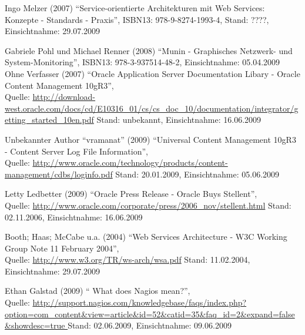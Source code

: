 \documentclass[12pt, a4paper, headsepline]{article}
\begin{document}
\begin{thebibliography}{xxxxxxxx}
		 Ingo Melzer (2007) "`Service-orientierte Architekturen mit Web Services: Konzepte - Standards - Praxis"', \newline ISBN13: 978-9-8274-1993-4, \newline Stand: ????, Einsichtnahme: 29.07.2009	 
		 
		 	  Gabriele Pohl und Michael Renner (2008) 
	 "`Munin - Graphisches Netzwerk- und System-Monitoring"', \newline ISBN13: 978-3-937514-48-2, Einsichtnahme: 05.04.2009\\	
	 	
	 
	  Ohne Verfasser (2007) "`Oracle Application Server Documentation Libary - Oracle Content Management 10gR3"', \\ Quelle: \url{http://download-west.oracle.com/docs/cd/E10316_01/cs/cs_doc_10/documentation/integrator/getting_started_10en.pdf} \newline Stand: unbekannt, Einsichtnahme: 16.06.2009
	 
	 	  Unbekannter Author "`vramanat"' (2009) "`Universal Content Management 10gR3 - Content Server Log File Information"', \\ Quelle: \url{http://www.oracle.com/technology/products/content-management/cdbs/loginfo.pdf} \newline Stand: 20.01.2009, Einsichtnahme: 05.06.2009
	 	 
	 	  Letty Ledbetter (2009) "`Oracle Press Release - Oracle Buys Stellent"', \\ Quelle: \url{http://www.oracle.com/corporate/press/2006_nov/stellent.html} \newline Stand: 02.11.2006, Einsichtnahme: 16.06.2009
	 	 
	 	 	  Booth; Haas; McCabe u.a. (2004) "`Web Services Architecture - W3C Working Group Note 11 February 2004"', \\ Quelle: \url{http://www.w3.org/TR/ws-arch/wsa.pdf} \newline Stand: 11.02.2004, Einsichtnahme: 29.07.2009
 	
 		 	 	  Ethan Galstad (2009) "`	What does Nagios mean?"', \\ Quelle: \url{http://support.nagios.com/knowledgebase/faqs/index.php?option=com\_content&view=article&id=52&catid=35&faq\_id=2&expand=false&showdesc=true	} \newline Stand: 02.06.2009, Einsichtnahme: 09.06.2009 
	 	 

 
	 	 
\end{thebibliography}

\section{\appendixname}
\end{document}
